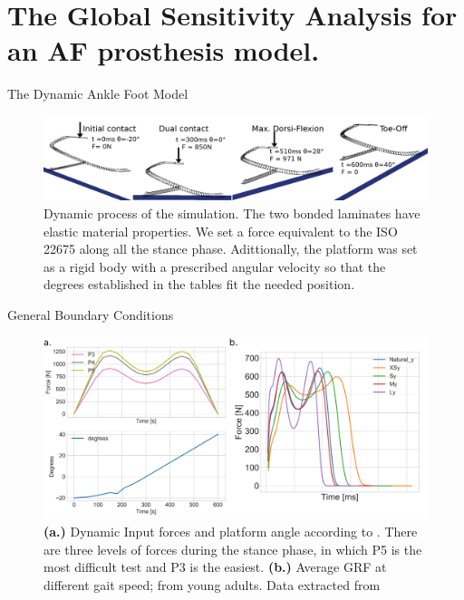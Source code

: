 \documentclass[10pt]{beamer}
\begin{document}
\section{The Global Sensitivity Analysis for an AF prosthesis model.}

\begin{frame}{The Dynamic Ankle Foot Model}
\begin{figure}
\centerline{\includegraphics[scale=0.5]{Feathergraphics/Dynamic_path.png}}
\caption{\label{fig:Dynamic_foot} Dynamic process of the simulation. The two bonded laminates have elastic material properties. We set a force equivalent to the ISO 22675 along all the stance phase. Adittionally, the platform was set as a rigid body with a prescribed angular velocity so that the degrees established in the tables fit the needed position.}
\end{figure}
\end{frame}

\begin{frame}{General Boundary Conditions}
\begin{figure}
\centerline{\includegraphics[scale=0.33]{Feathergraphics/combinedGRFISO_Real.png}}
\caption{\textbf{(a.)}\label{fig:ISO_GRF} Dynamic Input forces and platform angle according to \cite{ISO22675}. There are three levels of forces during the stance phase, in which P5 is the most difficult test and P3 is the easiest. \textbf{(b.)} Average GRF at different gait speed; from young adults. Data extracted from \cite{Bovi2011a}}
\end{figure}
\end{frame}
\end{document}
